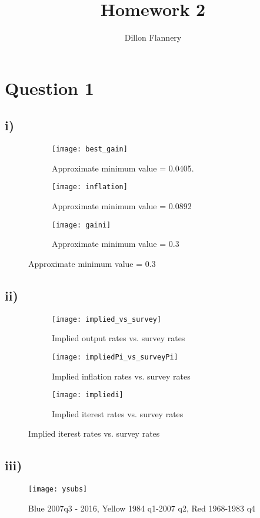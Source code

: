 \documentclass[]{article}
\title{Homework 2}
\author{Dillon Flannery}
\begin{document}
\maketitle

\section*{Question 1}

\subsection*{i)}
\begin{figure}[H]
	\begin{subfigure}{.3\textwidth}
		\texttt{[image: best\_gain]}
		\caption{Approximate minimum value = 0.0405.}
	\end{subfigure}
	\begin{subfigure}{.3\textwidth}
		\texttt{[image: inflation]}
		\caption{Approximate minimum value = 0.0892}
	\end{subfigure}	
	\begin{subfigure}{.3\textwidth}
		\texttt{[image: gaini]}
		\caption{Approximate minimum value = 0.3}
	\end{subfigure}
\end{figure}	

\subsection*{ii)}	
\begin{figure}[H]
	\begin{subfigure}[b]{.3\textwidth}
		\texttt{[image: implied\_vs\_survey]}
		\caption{Implied output rates vs. survey rates}
	\end{subfigure}	
	\begin{subfigure}[b]{.3\textwidth}
		\texttt{[image: impliedPi\_vs\_surveyPi]}
		\caption{Implied inflation rates vs. survey rates}
	\end{subfigure}	
	\begin{subfigure}[b]{.3\textwidth}
		\texttt{[image: impliedi]}
		\caption{Implied iterest rates vs. survey rates}
	\end{subfigure}	
\end{figure}

\subsection*{iii)}
\begin{figure}[H]
	\centering
	\texttt{[image: ysubs]}
	\caption{Blue 2007q3 - 2016, Yellow 1984 q1-2007 q2, Red 1968-1983 q4}
	\end{figure}	
	
\end{document}
